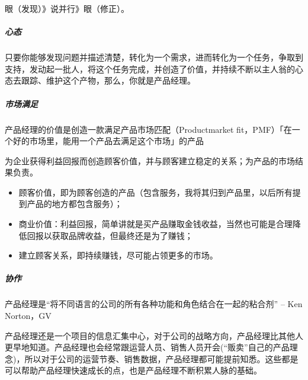 \documentclass[letterpaper,11pt,english]{sphinxmanual}
\begin{document}
眼（发现）\sphinxhyphen{}》说并行\sphinxhyphen{}》眼（修正）。


\subparagraph{心态}
\label{\detokenize{chapter_introduction/PM:id2}}
只要你能够发现问题并描述清楚，转化为一个需求，进而转化为一个任务，争取到支持，发动起一批人，将这个任务完成，并创造了价值，并持续不断以主人翁的心态去跟踪、维护这个产物，那么，你就是产品经理。


\subparagraph{市场满足}
\label{\detokenize{chapter_introduction/PM:id3}}
产品经理的价值是创造一款满足产品\sphinxhyphen{}市场匹配（Product\sphinxhyphen{}market
fit，PMF）「在一个好的市场里，能用一个产品去满足这个市场」的产品
%
\begin{footnote}[125]\sphinxAtStartFootnote
{}
%
\end{footnote}

为企业获得利益回报而创造顾客价值，并与顾客建立稳定的关系；为产品的市场结果负责。
\begin{itemize}
\item {} 
顾客价值，即为顾客创造的产品（包含服务，我将其归到产品里，以后所有提到产品的地方都包含服务）；

\item {} 
商业价值：利益回报，简单讲就是买产品赚取金钱收益，当然也可能是合理降低回报以获取品牌收益，但最终还是为了赚钱；

\item {} 
建立顾客关系，即持续赚钱，尽可能占领更多的市场。

\end{itemize}


\subparagraph{协作}
\label{\detokenize{chapter_introduction/PM:id4}}
产品经理是“将不同语言的公司的所有各种功能和角色结合在一起的粘合剂” – Ken
Norton，GV %
\begin{footnote}[126]\sphinxAtStartFootnote
{}
%
\end{footnote}

产品经理还是一个项目的信息汇集中心，对于公司的战略方向，产品经理比其他人更早地知道。产品经理也会经常跟运营人员、销售人员开会(“贩卖”自己的产品理念)，所以对于公司的运营节奏、销售数据，产品经理都可能提前知悉。这些都是可以帮助产品经理快速成长的点，也是产品经理不断积累人脉的基础。
%
\begin{footnote}[127]\sphinxAtStartFootnote
{}
%
\end{footnote}
\end{document}
